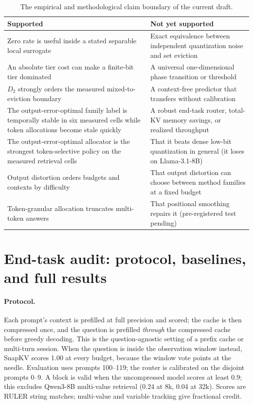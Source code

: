 \begin{table}[h]
\centering
\small
\begin{tabular}{@{}p{}p{}@{}}
\toprule
\textbf{Supported} & \textbf{Not yet supported} \\
\midrule
Zero rate is useful inside a stated separable local surrogate
& Exact equivalence between independent quantization noise and set eviction \\
An absolute tier cost can make a finite-bit tier dominated
& A universal one-dimensional phase transition or threshold \\
$D_2$ strongly orders the measured mixed-to-eviction boundary
& A context-free predictor that transfers without calibration \\
The output-error-optimal family label is temporally stable in six measured cells while token allocations become stale quickly
& A robust end-task router, total-KV memory savings, or realized throughput \\
The output-error-optimal allocator is the strongest token-selective policy on the measured retrieval cells
& That it beats dense low-bit quantization in general (it loses on Llama-3.1-8B) \\
Output distortion orders budgets and contexts by difficulty
& That output distortion can choose between method families at a fixed budget \\
Token-granular allocation truncates multi-token answers
& That positional smoothing repairs it (pre-registered test pending) \\
\bottomrule
\end{tabular}
\caption{The empirical and methodological claim boundary of the current draft.}
\label{tab:app-claims}
\end{table}

\section{End-task audit: protocol, baselines, and full results}
\label{app:endtask}

\paragraph{Protocol.}
Each prompt's context is prefilled at full precision and scored; the cache is
then compressed once, and the question is prefilled \emph{through} the
compressed cache before greedy decoding.  This is the question-agnostic setting
of a prefix cache or multi-turn session.  When the question is inside the
observation window instead, SnapKV scores 1.00 at every budget, because the
window vote points at the needle.  Evaluation uses prompts 100--119; the
\sieve{} router is calibrated on the disjoint prompts 0--9.  A block is valid
when the uncompressed model scores at least 0.9; this excludes Qwen3-8B
multi-value retrieval (0.24 at 8k, 0.04 at 32k).  Scores are RULER string
matches; multi-value and variable tracking give fractional credit.


